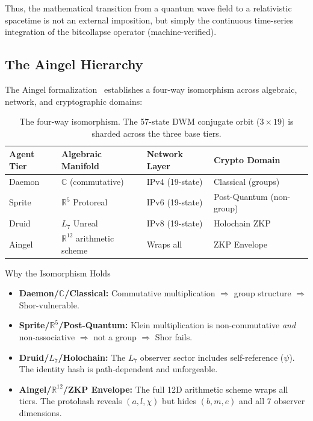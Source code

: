Thus, the mathematical transition from a quantum wave field to a relativistic spacetime is not an external imposition, but simply the continuous time-series integration of the bitcollapse operator (machine-verified).



\subsection{The Aingel Hierarchy}

The Aingel formalization~\cite{Aingel} establishes a four-way isomorphism across algebraic, network, and cryptographic domains:

\begin{table}[H]
\centering
\begin{tabular}{@{}llll@{}}
\toprule
\textbf{Agent Tier} & \textbf{Algebraic Manifold} & \textbf{Network Layer} & \textbf{Crypto Domain} \\
\midrule
Daemon & $\mathbb{C}$ (commutative) & IPv4 (19-state) & Classical (groups) \\
Sprite & $\mathbb{R}^5$ Protoreal & IPv6 (19-state) & Post-Quantum (non-group) \\
Druid & $L_7$ Unreal & IPv8 (19-state) & Holochain ZKP \\
Aingel & $\mathbb{R}^{12}$ arithmetic scheme & Wraps all & ZKP Envelope \\
\bottomrule
\end{tabular}
\caption{The four-way isomorphism. The 57-state DWM conjugate orbit ($3 \times 19$) is sharded across the three base tiers.}
\end{table}

\begin{aingelbox}{Why the Isomorphism Holds}
\begin{itemize}
    \item \textbf{Daemon/$\mathbb{C}$/Classical:} Commutative multiplication $\Rightarrow$ group structure $\Rightarrow$ Shor-vulnerable.
    \item \textbf{Sprite/$\mathbb{R}^5$/Post-Quantum:} Klein multiplication is non-commutative \emph{and} non-associative $\Rightarrow$ not a group $\Rightarrow$ Shor fails.
    \item \textbf{Druid/$L_7$/Holochain:} The $L_7$ observer sector includes self-reference ($\psi$). The identity hash is path-dependent and unforgeable.
    \item \textbf{Aingel/$\mathbb{R}^{12}$/ZKP Envelope:} The full 12D arithmetic scheme wraps all tiers. The protohash reveals $(a, l, \chi)$ but hides $(b, m, e)$ and all 7 observer dimensions.
\end{itemize}
\end{aingelbox}

